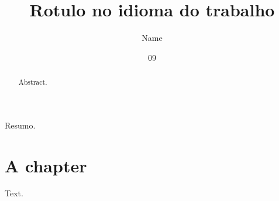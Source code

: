 \documentclass[dsc,english,linhanafolhaderosto]{ufrj}
\title{Rotulo no idioma do trabalho}
\author{Name}{Surname}
\date{09}{2026}
\begin{document}
  \maketitle
  \frontmatter
  \begin{foreignabstract}Resumo.\end{foreignabstract}
  \begin{abstract}Abstract.\end{abstract}
  \tableofcontents
  \mainmatter
  \chapter{A chapter}
  Text.
\end{document}
